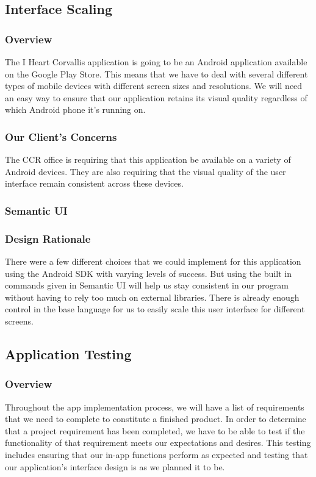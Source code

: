 \documentclass[draftclsnofoot, onecolumn, 10pt, compsoc]{IEEEtran}
\begin{document}
		\subsection{Interface Scaling}
			\subsubsection{Overview}
				The I Heart Corvallis application is going to be an Android application available on the Google Play Store. This means that we have to deal with several different types of mobile devices with different screen sizes and resolutions. We will need an easy way to ensure that our application retains its visual quality regardless of which Android phone it's running on.
			\subsubsection{Our Client's Concerns}
				The CCR office is requiring that this application be available on a variety of Android devices. They are also requiring that the visual quality of the user interface remain consistent across these devices.
			\subsubsection{Semantic UI}
			\subsubsection{Design Rationale}
				There were a few different choices that we could implement for this application using the Android SDK with varying levels of success. But using the built in commands given in Semantic UI will help us stay consistent in our program without having to rely too much on external libraries. There is already enough control in the base language for us to easily scale this user interface for different screens.

		\subsection{Application Testing}
			\subsubsection{Overview}
				Throughout the app implementation process, we will have a list of requirements that we need to complete to constitute a finished product. In order to determine that a project requirement has been completed, we have to be able to test if the functionality of that requirement meets our expectations and desires. This testing includes ensuring that our in-app functions perform as expected and testing that our application's interface design is as we planned it to be.
\end{document}
